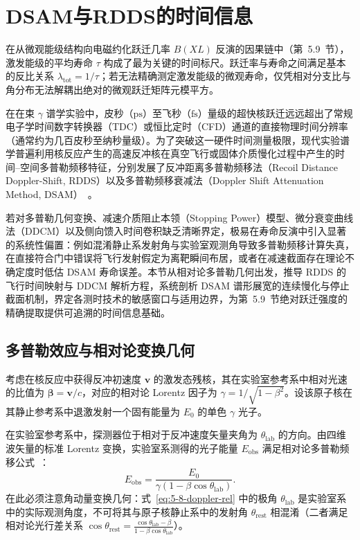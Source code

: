 \section{DSAM与RDDS的时间信息}\label{sec:5-8}

在从微观能级结构向电磁约化跃迁几率 $B(XL)$ 反演的因果链中（第~5.9~节），激发能级的平均寿命 $\tau$ 构成了最为关键的时间标尺。跃迁率与寿命之间满足基本的反比关系 $\lambda_{\mathrm{tot}} = 1/\tau$；若无法精确测定激发能级的微观寿命，仅凭相对分支比与角分布无法解耦出绝对的微观跃迁矩阵元模平方。

在在束 $\gamma$ 谱学实验中，皮秒（$\text{ps}$）至飞秒（$\text{fs}$）量级的超快核跃迁远远超出了常规电子学时间数字转换器（TDC）或恒比定时（CFD）通道的直接物理时间分辨率（通常约为几百皮秒至纳秒量级）。为了突破这一硬件时间测量极限，现代实验谱学普遍利用核反应产生的高速反冲核在真空飞行或固体介质慢化过程中产生的时间--空间多普勒频移特征，分别发展了反冲距离多普勒频移法（Recoil Distance Doppler-Shift, RDDS）以及多普勒频移衰减法（Doppler Shift Attenuation Method, DSAM）~\cite{dewald-2012-ddcm-recoil-distance, book-wu-nuclear-experiment-methods}。

若对多普勒几何变换、减速介质阻止本领（Stopping Power）模型、微分衰变曲线法（DDCM）以及侧向馈入时间卷积缺乏清晰界定，极易在寿命反演中引入显著的系统性偏置：例如混淆静止系发射角与实验室观测角导致多普勒频移计算失真，在直接符合门中错误将飞行发射假定为离靶瞬间布居，或者在减速截面存在理论不确定度时低估 DSAM 寿命误差。本节从相对论多普勒几何出发，推导 RDDS 的飞行时间映射与 DDCM 解析方程，系统剖析 DSAM 谱形展宽的连续慢化与停止截面机制，界定各测时技术的敏感窗口与适用边界，为第~5.9~节绝对跃迁强度的精确提取提供可追溯的时间信息基础。

\subsection{多普勒效应与相对论变换几何}\label{subsec:5-8-1}

考虑在核反应中获得反冲初速度 $\mathbf{v}$ 的激发态残核，其在实验室参考系中相对光速的比值为 $\boldsymbol{\beta} = \mathbf{v}/c$，对应的相对论 Lorentz 因子为 $\gamma = 1/\sqrt{1 - \beta^2}$。设该原子核在其静止参考系中退激发射一个固有能量为 $E_0$ 的单色 $\gamma$ 光子。

在实验室参考系中，探测器位于相对于反冲速度矢量夹角为 $\theta_{\mathrm{lab}}$ 的方向。由四维波矢量的标准 Lorentz 变换，实验室系测得的光子能量 $E_{\mathrm{obs}}$ 满足相对论多普勒频移公式~\cite{dewald-2012-ddcm-recoil-distance}：
\begin{equation}\label{eq:5-8-doppler-rel}
E_{\mathrm{obs}} = \frac{E_0}{\gamma (1 - \beta \cos\theta_{\mathrm{lab}})}.
\end{equation}
在此必须注意角动量变换几何：式~\eqref{eq:5-8-doppler-rel} 中的极角 $\theta_{\mathrm{lab}}$ 是实验室系中的实际观测角度，不可将其与原子核静止系中的发射角 $\theta_{\mathrm{rest}}$ 相混淆（二者满足相对论光行差关系 $\cos\theta_{\mathrm{rest}} = \frac{\cos\theta_{\mathrm{lab}} - \beta}{1 - \beta\cos\theta_{\mathrm{lab}}}$）。

